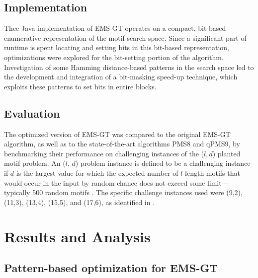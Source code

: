 \documentclass[oneside,12pt]{DISCSthesis}
\begin{document}
{	\section{Implementation}
		Thee Java implementation of EMS-GT operates on a compact, bit-based enumerative representation of the motif search space. 
		Since a significant part of runtime is spent locating and setting bits in this bit-based representation, optimizations were explored for the bit-setting portion of the algorithm. Investigation of some Hamming distance-based patterns in the search space led to the development and integration of a bit-masking speed-up technique, which exploits these patterns to set bits in entire blocks.

	\section{Evaluation}
		The optimized version of EMS-GT was compared to the original EMS-GT algorithm, as well as to the state-of-the-art algorithms PMS8 and qPMS9, by benchmarking their performance on challenging instances of the ($l, d$) planted motif problem. An ($l$, $d$) problem instance is defined to be a challenging instance if $d$ is the largest value for which the expected number of $l$-length motifs that would occur in the input by random chance does not exceed some limit---typically 500 random motifs \cite{pms2015}. The specific challenge instances used were (9,2), (11,3), (13,4), (15,5), and (17,6), as identified in \cite{pms2015,pms2007}. 
		\bigskip

\chapter{Results and Analysis}
	\section{Pattern-based optimization for EMS-GT}
		
					
}
\end{document}
